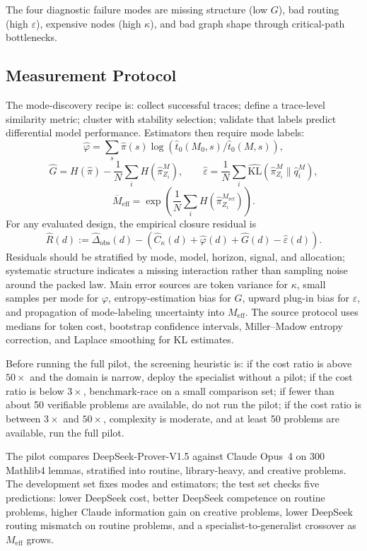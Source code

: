 \documentclass[10pt]{article}
\theoremstyle{paperplain}
\theoremstyle{paperdefinition}
\theoremstyle{paperremark}
\newcommand{\KL}{\mathrm{KL}}
\newcommand{\Meff}{M_{\mathrm{eff}}}
\begin{document}
The four diagnostic failure modes are missing structure (low $G$), bad routing (high $\varepsilon$), expensive nodes (high $\kappa$), and bad graph shape through critical-path bottlenecks.

\subsection{Measurement Protocol}
\label{subsec:mode-discovery}
\label{subsec:estimators}
\label{subsec:pilot}

The mode-discovery recipe is: collect successful traces; define a trace-level similarity metric; cluster with stability selection; validate that labels predict differential model performance. Estimators then require mode labels:
\[
\hat\varphi=\sum_s\hat\pi(s)\log(\hat t_0(M_0,s)/\hat t_0(M,s)),
\]
\[
\hat G=H(\hat\pi)-\frac{1}{N}\sum_i H(\hat\pi_{Z_i}^M),
\qquad
\hat\varepsilon=\frac{1}{N}\sum_i\widehat{\KL}(\hat\pi_{Z_i}^M\|\hat q_i^M),
\]
\[
\overline M_{\mathrm{eff}}=\exp\!\left(\frac{1}{N}\sum_i H(\hat\pi_{Z_i}^{M_{\mathrm{ref}}})\right).
\]
For any evaluated design, the empirical closure residual is
\[
\widehat R(d)
:=\widehat\Delta_{\mathrm{obs}}(d)
-\left(\widehat C_\kappa(d)+\widehat\varphi(d)
+\widehat G(d)-\widehat\varepsilon(d)\right).
\]
Residuals should be stratified by mode, model, horizon, signal, and allocation;
systematic structure indicates a missing interaction rather than sampling noise
around the packed law.
Main error sources are token variance for $\kappa$, small samples per mode for $\varphi$, entropy-estimation bias for $G$, upward plug-in bias for $\varepsilon$, and propagation of mode-labeling uncertainty into $\Meff$. The source protocol uses medians for token cost, bootstrap confidence intervals, Miller--Madow entropy correction, and Laplace smoothing for KL estimates.

Before running the full pilot, the screening heuristic is: if the cost ratio is above $50\times$ and the domain is narrow, deploy the specialist without a pilot; if the cost ratio is below $3\times$, benchmark-race on a small comparison set; if fewer than about 50 verifiable problems are available, do not run the pilot; if the cost ratio is between $3\times$ and $50\times$, complexity is moderate, and at least 50 problems are available, run the full pilot.

The pilot compares DeepSeek-Prover-V1.5 against Claude Opus~4 on 300 Mathlib4 lemmas, stratified into routine, library-heavy, and creative problems. The development set fixes modes and estimators; the test set checks five predictions: lower DeepSeek cost, better DeepSeek competence on routine problems, higher Claude information gain on creative problems, lower DeepSeek routing mismatch on routine problems, and a specialist-to-generalist crossover as $\Meff$ grows.
\end{document}
